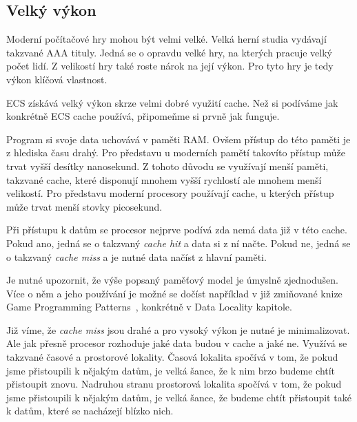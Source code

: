 
\subsection{Velký výkon}
\label{sec:ecs_props}

Moderní počítačové hry mohou být velmi velké. Velká herní studia vydávají takzvané AAA tituly. Jedná se o opravdu velké hry, na kterých pracuje velký počet lidí. Z velikostí hry také roste nárok na její výkon. Pro tyto hry je tedy výkon klíčová vlastnost.

ECS získává velký výkon skrze velmi dobré využití cache. Než si podíváme jak konkrétně ECS cache používá, připomeňme si prvně jak funguje.

Program si svoje data uchovává v paměti RAM. Ovšem přístup do této paměti je z hlediska času drahý. Pro představu u moderních pamětí takovíto přístup může trvat vyšší desítky nanosekund. Z tohoto důvodu se využívají menší paměti, takzvané cache, které disponují mnohem vyšší rychlostí ale mnohem menší velikostí. Pro představu moderní procesory používají cache, u kterých přístup může trvat menší stovky picosekund.


Při přístupu k datům se procesor nejprve podívá zda nemá data již v této cache. Pokud ano, jedná se o takzvaný \textit{cache hit} a data si z ní načte. Pokud ne, jedná se o takzvaný \textit{cache miss} a je nutné data načíst z hlavní paměti. 

Je nutné upozornit, že výše popsaný paměťový model je úmyslně zjednodušen. Více o něm a jeho používání je možné se dočíst například v již zmiňované knize Game Programming Patterns~\cite{nystrom2014game}, konkrétně v Data Locality kapitole.

Již víme, že \textit{cache miss} jsou drahé a pro vysoký výkon je nutné je minimalizovat. Ale jak přesně procesor rozhoduje jaké data budou v cache a jaké ne. Využívá se takzvané časové a prostorové lokality. Časová lokalita spočívá v tom, že pokud jsme přistoupili k nějakým datům, je velká šance, že k nim brzo budeme chtít přistoupit znovu. Nadruhou stranu prostorová lokalita spočívá v tom, že pokud jsme přistoupili k nějakým datům, je velká šance, že budeme chtít přistoupit také k datům, které se nacházejí blízko nich.

